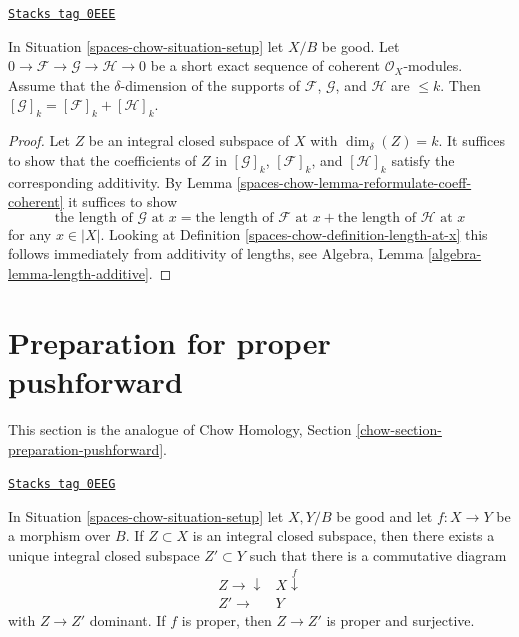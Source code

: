 \begin{lemma}
\label{spaces-chow-lemma-additivity-sheaf-cycle}
\href{https://stacks.math.columbia.edu/tag/0EEE}{\texttt{Stacks tag 0EEE}}

In Situation \ref{spaces-chow-situation-setup} let $X/B$ be good.
Let $0 \to \mathcal{F} \to \mathcal{G} \to \mathcal{H} \to 0$
be a short exact sequence of coherent $\mathcal{O}_X$-modules.
Assume that the $\delta$-dimension of the supports
of $\mathcal{F}$, $\mathcal{G}$, and $\mathcal{H}$ are $\leq k$.
Then $[\mathcal{G}]_k = [\mathcal{F}]_k + [\mathcal{H}]_k$.
\end{lemma}

\begin{proof}
Let $Z$ be an integral closed subspace of $X$ with $\dim_\delta(Z) = k$.
It suffices to show that the coefficients of
$Z$ in $[\mathcal{G}]_k$, $[\mathcal{F}]_k$, and $[\mathcal{H}]_k$
satisfy the corresponding additivity. By
Lemma \ref{spaces-chow-lemma-reformulate-coeff-coherent}
it suffices to show
$$
\text{the length of }\mathcal{G}\text{ at }x =
\text{the length of }\mathcal{F}\text{ at }x +
\text{the length of }\mathcal{H}\text{ at }x
$$
for any $x \in |X|$. Looking at Definition \ref{spaces-chow-definition-length-at-x}
this follows immediately from additivity of lengths, see
Algebra, Lemma \ref{algebra-lemma-length-additive}.
\end{proof}

\section{Preparation for proper pushforward}
\label{spaces-chow-section-preparation-pushforward}
This section is the analogue of
Chow Homology, Section \ref{chow-section-preparation-pushforward}.

\begin{lemma}
\label{spaces-chow-lemma-proper-image}
\href{https://stacks.math.columbia.edu/tag/0EEG}{\texttt{Stacks tag 0EEG}}

In Situation \ref{spaces-chow-situation-setup} let $X,Y/B$ be good and let $f : X \to Y$
be a morphism over $B$. If $Z \subset X$ is an integral closed subspace, then
there exists a unique integral closed subspace $Z' \subset Y$ such that there
is a commutative diagram
$$
\begin{array}{cc}Z \longrightarrow\downarrow & X \overset{f}{\downarrow} \\ Z' \longrightarrow & Y\end{array}
$$
with $Z \to Z'$ dominant. If $f$ is proper, then $Z \to Z'$ is proper
and surjective.
\end{lemma}

